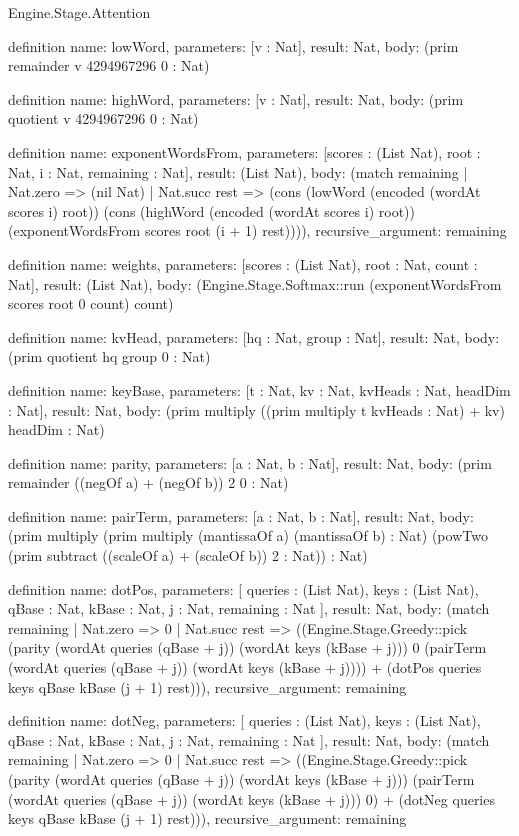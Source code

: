 \begin{lexlean}{Engine.Stage.Attention}
\begin{semanticmodule}
definition{
  name: lowWord,
  parameters: [v : Nat],
  result: Nat,
  body: (prim remainder v 4294967296 0 : Nat)
}

definition{
  name: highWord,
  parameters: [v : Nat],
  result: Nat,
  body: (prim quotient v 4294967296 0 : Nat)
}

definition{
  name: exponentWordsFrom,
  parameters: [scores : (List Nat), root : Nat, i : Nat, remaining : Nat],
  result: (List Nat),
  body: (match remaining
    | Nat.zero => (nil Nat)
    | Nat.succ rest => (cons (lowWord (encoded (wordAt scores i) root)) (cons (highWord (encoded (wordAt scores i) root)) (exponentWordsFrom scores root (i + 1) rest)))),
  recursive_argument: remaining
}

definition{
  name: weights,
  parameters: [scores : (List Nat), root : Nat, count : Nat],
  result: (List Nat),
  body: (Engine.Stage.Softmax::run (exponentWordsFrom scores root 0 count) count)
}

definition{
  name: kvHead,
  parameters: [hq : Nat, group : Nat],
  result: Nat,
  body: (prim quotient hq group 0 : Nat)
}

definition{
  name: keyBase,
  parameters: [t : Nat, kv : Nat, kvHeads : Nat, headDim : Nat],
  result: Nat,
  body: (prim multiply ((prim multiply t kvHeads : Nat) + kv) headDim : Nat)
}

definition{
  name: parity,
  parameters: [a : Nat, b : Nat],
  result: Nat,
  body: (prim remainder ((negOf a) + (negOf b)) 2 0 : Nat)
}

definition{
  name: pairTerm,
  parameters: [a : Nat, b : Nat],
  result: Nat,
  body: (prim multiply (prim multiply (mantissaOf a) (mantissaOf b) : Nat) (powTwo (prim subtract ((scaleOf a) + (scaleOf b)) 2 : Nat)) : Nat)
}

definition{
  name: dotPos,
  parameters: [
    queries : (List Nat),
    keys : (List Nat),
    qBase : Nat,
    kBase : Nat,
    j : Nat,
    remaining : Nat
  ],
  result: Nat,
  body: (match remaining
    | Nat.zero => 0
    | Nat.succ rest => ((Engine.Stage.Greedy::pick (parity (wordAt queries (qBase + j)) (wordAt keys (kBase + j))) 0 (pairTerm (wordAt queries (qBase + j)) (wordAt keys (kBase + j)))) + (dotPos queries keys qBase kBase (j + 1) rest))),
  recursive_argument: remaining
}

definition{
  name: dotNeg,
  parameters: [
    queries : (List Nat),
    keys : (List Nat),
    qBase : Nat,
    kBase : Nat,
    j : Nat,
    remaining : Nat
  ],
  result: Nat,
  body: (match remaining
    | Nat.zero => 0
    | Nat.succ rest => ((Engine.Stage.Greedy::pick (parity (wordAt queries (qBase + j)) (wordAt keys (kBase + j))) (pairTerm (wordAt queries (qBase + j)) (wordAt keys (kBase + j))) 0) + (dotNeg queries keys qBase kBase (j + 1) rest))),
  recursive_argument: remaining
}


\end{semanticmodule}
\end{lexlean}
